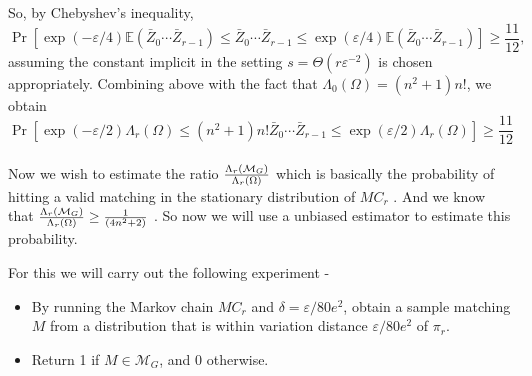 \begin{flushleft}
	So, by Chebyshev's inequality,
	$$
	\operatorname{Pr}\left[\exp (-\varepsilon / 4) \mathbb{E}\left(\bar{Z}_0 \cdots \bar{Z}_{r-1}\right) \leq \bar{Z}_0 \cdots \bar{Z}_{r-1} \leq \exp (\varepsilon / 4) \mathbb{E}\left(\bar{Z}_0 \cdots \bar{Z}_{r-1}\right)\right] \geq \frac{11}{12} \text {, }
	$$
	assuming the constant implicit in the setting $s=\Theta\left(r \varepsilon^{-2}\right)$ is chosen appropriately. Combining above with the fact that $\Lambda_0(\Omega)=\left(n^2+1\right) n!$, we obtain
	$$
	\operatorname{Pr}\left[\exp (-\varepsilon / 2) \Lambda_r(\Omega) \leq\left(n^2+1\right) n!\bar{Z}_0 \cdots \bar{Z}_{r-1} \leq \exp (\varepsilon / 2) \Lambda_r(\Omega)\right] \geq \frac{11}{12}
	$$
	\\
	Now we wish to estimate the ratio $\frac{\Lambda_{r}(\mathcal{M}_G)}{\Lambda_r(\Omega)}$ which is basically the probability of hitting a valid matching in the stationary distribution of $MC_r$ . And we know that $\frac{\Lambda_{r}(\mathcal{M}_G)}{\Lambda_r(\Omega)}\geq \frac{1}{(4n^2+2)}$ . So now we will use a unbiased estimator to estimate this probability. \\
	
\end{flushleft}
\break
\begin{flushleft}
	For this we will carry out the following experiment -
	\end{flushleft}
\begin{itemize}
	\item By running the Markov chain $M C_r$ and $\delta=\varepsilon / 80 e^2$, obtain a sample matching $M$ from a distribution that is within variation distance $\varepsilon / 80 e^2$ of $\pi_r$.
	
	\item Return 1 if $M \in \mathcal{M}_G$, and 0 otherwise.\\
\end{itemize}
